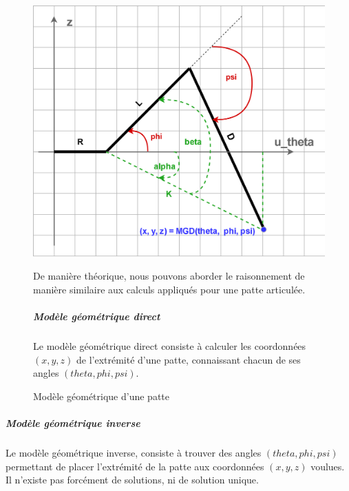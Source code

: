                 \begin{figure}[!h]
                \begin{minipage}{0.55\linewidth}
                    \centering                    \includegraphics[width=0.9\linewidth]{Figures/geo_leg}
                    \caption{Modèle géométrique d'une patte}\label{fig:geo_leg}
                \end{minipage}
                \hfill
                \begin{minipage}{0.425\linewidth}
                \myDefautStyle
                De manière théorique, nous pouvons aborder le raisonnement de manière similaire aux calculs appliqués pour une patte articulée.
                \subparagraph{Modèle géométrique direct}
                    Le modèle géométrique direct consiste à calculer les coordonnées $(x, y, z)$ de l'extrémité d'une patte, connaissant chacun de ses angles $(theta, phi, psi)$.
                \end{minipage}
                \end{figure}
                \subparagraph{Modèle géométrique inverse}
                    Le modèle géométrique inverse, consiste à trouver des angles $(theta, phi, psi)$ permettant de placer l'extrémité de la patte aux coordonnées $(x, y, z)$ voulues. Il n'existe pas forcément de solutions, ni de solution unique.
